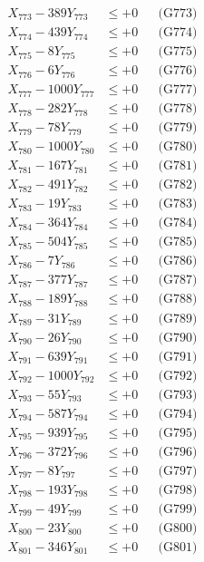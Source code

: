 \documentclass[a4paper,10pt]{article}
\begin{document}
{\begin{align}
X_{773} - 389Y_{773} &\leq +0 && \text{(G773)} \\
X_{774} - 439Y_{774} &\leq +0 && \text{(G774)} \\
X_{775} - 8Y_{775} &\leq +0 && \text{(G775)} \\
X_{776} - 6Y_{776} &\leq +0 && \text{(G776)} \\
X_{777} - 1000Y_{777} &\leq +0 && \text{(G777)} \\
X_{778} - 282Y_{778} &\leq +0 && \text{(G778)} \\
X_{779} - 78Y_{779} &\leq +0 && \text{(G779)} \\
X_{780} - 1000Y_{780} &\leq +0 && \text{(G780)} \\
\allowbreak
X_{781} - 167Y_{781} &\leq +0 && \text{(G781)} \\
X_{782} - 491Y_{782} &\leq +0 && \text{(G782)} \\
X_{783} - 19Y_{783} &\leq +0 && \text{(G783)} \\
X_{784} - 364Y_{784} &\leq +0 && \text{(G784)} \\
X_{785} - 504Y_{785} &\leq +0 && \text{(G785)} \\
X_{786} - 7Y_{786} &\leq +0 && \text{(G786)} \\
X_{787} - 377Y_{787} &\leq +0 && \text{(G787)} \\
X_{788} - 189Y_{788} &\leq +0 && \text{(G788)} \\
X_{789} - 31Y_{789} &\leq +0 && \text{(G789)} \\
X_{790} - 26Y_{790} &\leq +0 && \text{(G790)} \\
\allowbreak
X_{791} - 639Y_{791} &\leq +0 && \text{(G791)} \\
X_{792} - 1000Y_{792} &\leq +0 && \text{(G792)} \\
X_{793} - 55Y_{793} &\leq +0 && \text{(G793)} \\
X_{794} - 587Y_{794} &\leq +0 && \text{(G794)} \\
X_{795} - 939Y_{795} &\leq +0 && \text{(G795)} \\
X_{796} - 372Y_{796} &\leq +0 && \text{(G796)} \\
X_{797} - 8Y_{797} &\leq +0 && \text{(G797)} \\
X_{798} - 193Y_{798} &\leq +0 && \text{(G798)} \\
X_{799} - 49Y_{799} &\leq +0 && \text{(G799)} \\
X_{800} - 23Y_{800} &\leq +0 && \text{(G800)} \\
\allowbreak
X_{801} - 346Y_{801} &\leq +0 && \text{(G801)} \\

\end{align}}
\end{document}
